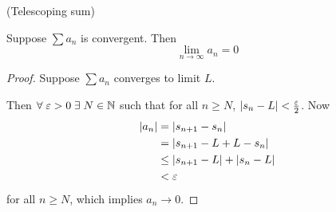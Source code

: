 \begin{rem}
    (Telescoping sum)
\end{rem}

\begin{thm} \label{thm:series:convergent=>limit=0}
    Suppose $\sum a_{n}$ is convergent. Then \[
        \lim_{n \to \infty} a_{n} = 0
    \]
\end{thm}
\begin{proof}
    Suppose $\sum a_{n}$ converges to limit $L$.

    Then $\forall\; \varepsilon > 0 \;\exists\; N \in \mathbb{N}$ such that for all $n \geq N$, $\abs{s_{n} - L} < \frac{\varepsilon}{2}$. Now
    \begin{align*}
        \abs{a_{n}} &= \abs{s_{n+1} - s_{n}} \\
        &= \abs{s_{n+1} - L + L - s_{n}} \\
        &\leq \abs{s_{n+1} - L} + \abs{s_{n} - L} \\
        &< \varepsilon
    \end{align*}
    for all $n \geq N$, which implies $a_{n} \to 0$.
\end{proof}
